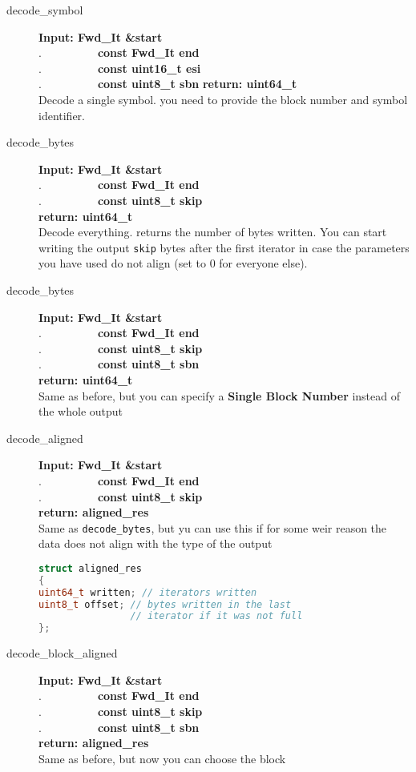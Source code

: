\documentclass[11pt,a4paper]{refart}
\begin{document}
\begin{description}
\item[decode\_symbol]\textbf{Input: Fwd\_It \&start}\\
.\ \ \ \ \ \ \ \ \ \ \textbf{const Fwd\_It end}\\
.\ \ \ \ \ \ \ \ \ \ \textbf{const uint16\_t esi}\\
.\ \ \ \ \ \ \ \ \ \ \textbf{const uint8\_t sbn}
\textbf{return: uint64\_t}\\
Decode a single symbol. you need to provide the block number and symbol identifier.

\item[decode\_bytes] \textbf{Input: Fwd\_It \&start}\\
.\ \ \ \ \ \ \ \ \ \ \textbf{const Fwd\_It end}\\
.\ \ \ \ \ \ \ \ \ \ \textbf{const uint8\_t skip}\\
\textbf{return: uint64\_t}\\
Decode everything. returns the number of bytes written. You can start writing the output \texttt{skip} bytes after the first iterator in case the parameters you have used do not align (set to $0$ for everyone else).
\item[decode\_bytes] \textbf{Input: Fwd\_It \&start}\\
.\ \ \ \ \ \ \ \ \ \ \textbf{const Fwd\_It end}\\
.\ \ \ \ \ \ \ \ \ \ \textbf{const uint8\_t skip}\\
.\ \ \ \ \ \ \ \ \ \ \textbf{const uint8\_t sbn}\\
\textbf{return: uint64\_t}\\
Same as before, but you can specify a \textbf{Single Block Number} instead of the whole output
\newpage
\item[decode\_aligned]\textbf{Input: Fwd\_It \&start}\\
.\ \ \ \ \ \ \ \ \ \ \textbf{const Fwd\_It end}\\
.\ \ \ \ \ \ \ \ \ \ \textbf{const uint8\_t skip}\\
\textbf{return: aligned\_res}\\
Same as \texttt{decode\_bytes}, but yu can use this if for some weir reason the data does not align with the type of the output
\begin{lstlisting}[language=C++]
struct aligned_res
{
uint64_t written; // iterators written
uint8_t offset; // bytes written in the last
				// iterator if it was not full
};
\end{lstlisting}
\item[decode\_block\_aligned]\textbf{Input: Fwd\_It \&start}\\
.\ \ \ \ \ \ \ \ \ \ \textbf{const Fwd\_It end}\\
.\ \ \ \ \ \ \ \ \ \ \textbf{const uint8\_t skip}\\
.\ \ \ \ \ \ \ \ \ \ \textbf{const uint8\_t sbn}\\
\textbf{return: aligned\_res}\\
Same as before, but now you can choose the block



\end{description}
\end{document}
